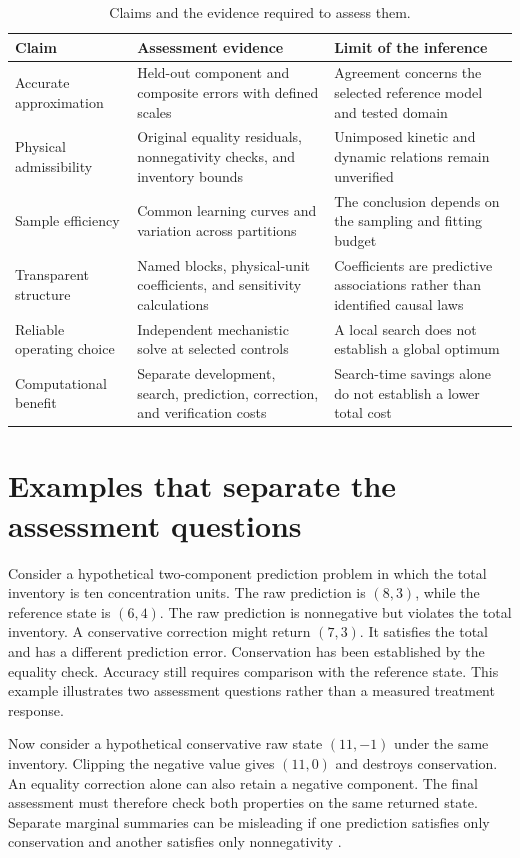 \begin{table}[htbp]
\centering
\caption{Claims and the evidence required to assess them.}
\label{tab:claim_evidence}
\small
\begin{tabular}{p{}p{}p{}}
\toprule
Claim & Assessment evidence & Limit of the inference \\
\midrule
Accurate approximation & Held-out component and composite errors with defined scales & Agreement concerns the selected reference model and tested domain \\
Physical admissibility & Original equality residuals, nonnegativity checks, and inventory bounds & Unimposed kinetic and dynamic relations remain unverified \\
Sample efficiency & Common learning curves and variation across partitions & The conclusion depends on the sampling and fitting budget \\
Transparent structure & Named blocks, physical-unit coefficients, and sensitivity calculations & Coefficients are predictive associations rather than identified causal laws \\
Reliable operating choice & Independent mechanistic solve at selected controls & A local search does not establish a global optimum \\
Computational benefit & Separate development, search, prediction, correction, and verification costs & Search-time savings alone do not establish a lower total cost \\
\bottomrule
\end{tabular}
\end{table}

\section{Examples that separate the assessment questions}

Consider a hypothetical two-component prediction problem in which the total inventory is ten concentration units. The raw prediction is $(8,3)$, while the reference state is $(6,4)$. The raw prediction is nonnegative but violates the total inventory. A conservative correction might return $(7,3)$. It satisfies the total and has a different prediction error. Conservation has been established by the equality check. Accuracy still requires comparison with the reference state. This example illustrates two assessment questions rather than a measured treatment response.

Now consider a hypothetical conservative raw state $(11,-1)$ under the same inventory. Clipping the negative value gives $(11,0)$ and destroys conservation. An equality correction alone can also retain a negative component. The final assessment must therefore check both properties on the same returned state. Separate marginal summaries can be misleading if one prediction satisfies only conservation and another satisfies only nonnegativity \citep{KircherVotsmeier2025,Haddad2010}.

